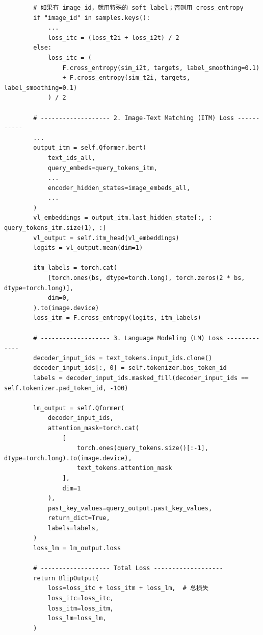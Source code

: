 \documentclass[zihao=false,fontset=windows]{ctexart}
\begin{document}
\begin{feishucode}
\begin{lstlisting}
        # 如果有 image_id，就用特殊的 soft label；否则用 cross_entropy
        if "image_id" in samples.keys():
            ...
            loss_itc = (loss_t2i + loss_i2t) / 2
        else:
            loss_itc = (
                F.cross_entropy(sim_i2t, targets, label_smoothing=0.1)
                + F.cross_entropy(sim_t2i, targets, label_smoothing=0.1)
            ) / 2

        # ------------------- 2. Image-Text Matching (ITM) Loss -----------
        ...
        output_itm = self.Qformer.bert(
            text_ids_all,
            query_embeds=query_tokens_itm,
            ...
            encoder_hidden_states=image_embeds_all,
            ...
        )
        vl_embeddings = output_itm.last_hidden_state[:, : query_tokens_itm.size(1), :]
        vl_output = self.itm_head(vl_embeddings)
        logits = vl_output.mean(dim=1)

        itm_labels = torch.cat(
            [torch.ones(bs, dtype=torch.long), torch.zeros(2 * bs, dtype=torch.long)],
            dim=0,
        ).to(image.device)
        loss_itm = F.cross_entropy(logits, itm_labels)

        # ------------------- 3. Language Modeling (LM) Loss -------------
        decoder_input_ids = text_tokens.input_ids.clone()
        decoder_input_ids[:, 0] = self.tokenizer.bos_token_id
        labels = decoder_input_ids.masked_fill(decoder_input_ids == self.tokenizer.pad_token_id, -100)

        lm_output = self.Qformer(
            decoder_input_ids,
            attention_mask=torch.cat(
                [
                    torch.ones(query_tokens.size()[:-1], dtype=torch.long).to(image.device),
                    text_tokens.attention_mask
                ],
                dim=1
            ),
            past_key_values=query_output.past_key_values,
            return_dict=True,
            labels=labels,
        )
        loss_lm = lm_output.loss

        # ------------------- Total Loss -------------------
        return BlipOutput(
            loss=loss_itc + loss_itm + loss_lm,  # 总损失
            loss_itc=loss_itc,
            loss_itm=loss_itm,
            loss_lm=loss_lm,
        )
\end{lstlisting}
\end{feishucode}

\par\vspace{0.6em}\par\vspace{0.2em}
\end{document}

